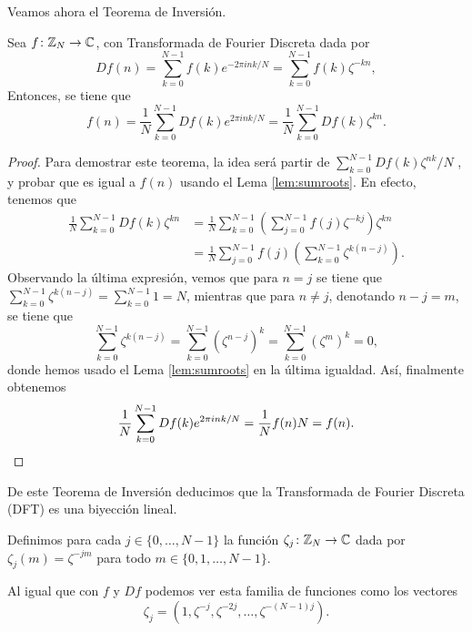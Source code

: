 \documentclass{article}
\begin{document}
Veamos ahora el Teorema de Inversión.

\begin{theorem}\label{thm:inv}
    Sea $f\colon\mathbb{Z}_N \rightarrow \mathbb{C}$, con Transformada de Fourier Discreta dada por
    \[
        Df(n) = \sum_{k=0}^{N-1}f(k)e^{-2\pi ink /N} = \sum_{k=0}^{N-1} f(k)  \zeta ^{-kn},
    \]
    Entonces, se tiene que
    \begin{equation}
        f(n) = \frac{1}{N} \sum_{k=0}^{N-1} Df(k)e^{2\pi ink / N} = \frac{1}{N} \sum_{k=0}^{N-1} Df(k) \zeta ^{kn}.
        \label{eq:inversion2}
    \end{equation}
\end{theorem}
\begin{proof}
    Para demostrar este teorema, la idea será partir de $\sum_{k=0}^{N-1} Df(k) \zeta^{nk} / N$ , y probar que es igual a $f(n)$ usando el Lema \ref{lem:sumroots}. En efecto, tenemos que 
    \begin{align*}
         \frac{1}{N} \sum_{k=0}^{N-1} Df(k) \zeta ^{kn} & = \frac{1}{N} \sum_{k=0}^{N-1} \left( \sum_{j=0}^{N-1} f(j)  \zeta ^{-kj} \right)  \zeta ^{kn} \\
            & = \frac{1}{N} \sum_{j=0}^{N-1} f(j) \left( \sum_{k=0}^{N-1}  \zeta ^{k(n-j)} \right).
    \end{align*}
    Observando la última expresión, vemos que para $n=j$ se tiene que $\sum_{k=0}^{N-1}  \zeta ^{k(n-j)} = \sum_{k=0}^{N-1} 1 = N$, mientras que para $n \neq j$, denotando $n-j = m$, se tiene que
    \[
        \sum_{k=0}^{N-1}  \zeta ^{k(n-j)} = \sum_{k=0}^{N-1} \left(  \zeta ^{n-j} \right) ^k = \sum_{k=0}^{N-1} \left(  \zeta ^{m} \right) ^k = 0,
    \]
    donde hemos usado el Lema \ref{lem:sumroots} en la última igualdad. Así, finalmente obtenemos
    \[
        \frac{1}{N} \sum_{k=0}^{N-1} Df(k)e^{2\pi ink / N} = \frac{1}{N}f(n)N = f(n). \qedhere
    \]
\end{proof} 
De este Teorema de Inversión deducimos que la Transformada de Fourier Discreta (DFT) es una biyección lineal.

\begin{definition}
    Definimos para cada $j \in \{0,\dots,N-1\}$ la función $\zeta_j \colon \mathbb{Z}_N \to \mathbb{C}$ dada por $\zeta_j(m)= \zeta^{-jm}$ para todo $m \in \{0,1,\ldots,N-1\}$.

    Al igual que con $f$ y $Df$ podemos ver esta familia de funciones como los vectores
    \[ \zeta_j = \left( 1, \zeta^{-j}, \zeta^{-2j}, \dots , \zeta^{-(N-1)j} \right).\]
\end{definition}
\end{document}
